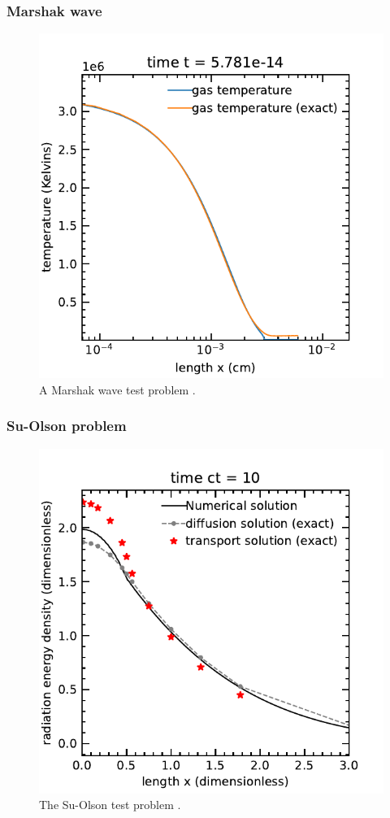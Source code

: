 \documentclass[fleqn,usenatbib]{mnras}
\begin{document}
\subsubsection{Marshak wave}
\begin{figure}
    \includegraphics[width=\columnwidth]{marshak_wave_cgs_gastemperature.pdf}
    \caption{A Marshak wave test problem \citep{Su_1996}.}
    \label{fig:marshak}
\end{figure}
\subsubsection{Su-Olson problem}
\begin{figure}
    \includegraphics[width=\columnwidth]{SuOlsonTest.pdf}
    \caption{The Su-Olson test problem \citep{Su_1997}.}
    \label{fig:suolson}
\end{figure}
\end{document}
